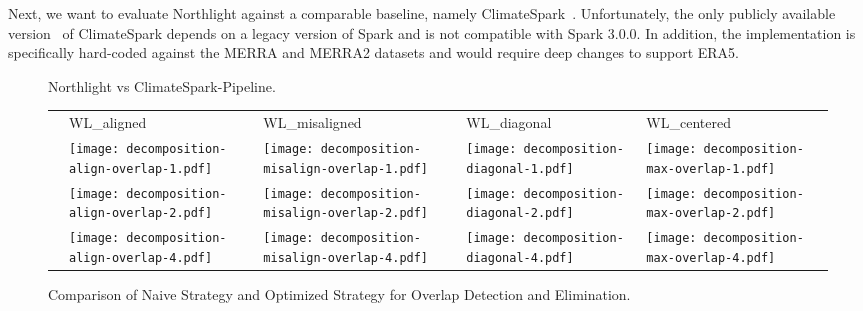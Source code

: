 \documentclass[conference]{IEEEtran}
\newcommand{\system}{Northlight}
\begin{document}
Next, we want to evaluate \system{} against a comparable baseline, namely ClimateSpark~\cite{lit:climatespark}. Unfortunately, the only publicly available version~\cite{lit:climatespark-github} of ClimateSpark depends on a legacy version of Spark and is not compatible with Spark 3.0.0. In addition, the implementation is specifically hard-coded against the MERRA and MERRA2 datasets and would require deep changes to support ERA5. 

\begin{figure}[h!]
\vspace*{-0.7cm}
\caption{\system{} vs ClimateSpark-Pipeline.}
\vspace*{-0.3cm}
\label{fig:climatespark}
\end{figure}

\begin{figure*}[h!]
\begin{tabular}{>{\centering\arraybackslash} m{5mm} @{} C @{} C @{} C @{} C}
& \hspace*{2mm} WL\_aligned & \hspace*{2mm} WL\_misaligned & \hspace*{2mm} WL\_diagonal & \hspace*{2mm} WL\_centered \\
 & \texttt{[image: decomposition-align-overlap-1.pdf]} & \texttt{[image: decomposition-misalign-overlap-1.pdf]} & \texttt{[image: decomposition-diagonal-1.pdf]} & \texttt{[image: decomposition-max-overlap-1.pdf]} \\
 & \texttt{[image: decomposition-align-overlap-2.pdf]} & \texttt{[image: decomposition-misalign-overlap-2.pdf]} & \texttt{[image: decomposition-diagonal-2.pdf]} & \texttt{[image: decomposition-max-overlap-2.pdf]} \\
 & \texttt{[image: decomposition-align-overlap-4.pdf]} & \texttt{[image: decomposition-misalign-overlap-4.pdf]} & \texttt{[image: decomposition-diagonal-4.pdf]} & \texttt{[image: decomposition-max-overlap-4.pdf]} \\
\end{tabular}
\vspace*{-0.2cm}
\caption{Comparison of Naive Strategy and Optimized Strategy for Overlap Detection and Elimination.}
\vspace*{-0.6cm}
\label{fig:overlap}
\end{figure*}
\end{document}

